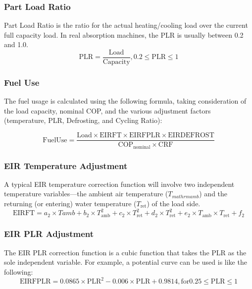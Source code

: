 \subsubsection{Part Load Ratio}
Part Load Ratio is the ratio for the actual heating/cooling load over the current full capacity load. In real absorption machines, the PLR is usually between 0.2 and 1.0. 
\begin{equation}
\mathrm{PLR} = \frac{\mathrm{Load}}{\mathrm{Capacity}}, 0.2 \leq \mathrm{PLR} \leq 1
\end{equation}

\subsubsection{Fuel Use}
The fuel usage is calculated using the following formula, taking consideration of the load capacity, nominal COP, and the various adjustment factors (temperature, PLR, Defrosting, and Cycling Ratio):

\begin{equation}
\mathrm{Fuel Use} = \frac{\mathrm{Load} \times \mathrm{EIRFT} \times \mathrm{EIRFPLR} \times \mathrm{EIRDEFROST}}{\mathrm{COP}_\mathrm{nominal} \times \mathrm{CRF}}
\end{equation}

\subsubsection{EIR Temperature Adjustment}
A typical EIR temperature correction function will involve two independent temperature variables---the ambient air temperature ($T_{mathrm{amb}}$) and the returning (or entering) water temperature ($T_{\mathrm{ret}}$) of the load side. 
\begin{equation}
\mathrm{EIRFT} = a_2 \times Tamb + b_2 \times T_{\mathrm{amb}}^{2} + c_2 \times T_{\mathrm{ret}}^{2} + d_2 \times T_{\mathrm{ret}}^{2} + e_2 \times T_{\mathrm{amb}} \times T_{\mathrm{ret}} + f_2
\end{equation}

\subsubsection{EIR PLR Adjustment}
The EIR PLR correction function is a cubic function that takes the PLR as the sole independent variable. For example, a potential curve can be used is like the following:  
\begin{equation}
\mathrm{EIRFPLR} = 0.0865 \times \mathrm{PLR}^{2} - 0.006 \times \mathrm{PLR} + 0.9814, \mathrm{for} 0.25 \leq \mathrm{PLR} \leq 1 
\end{equation}

